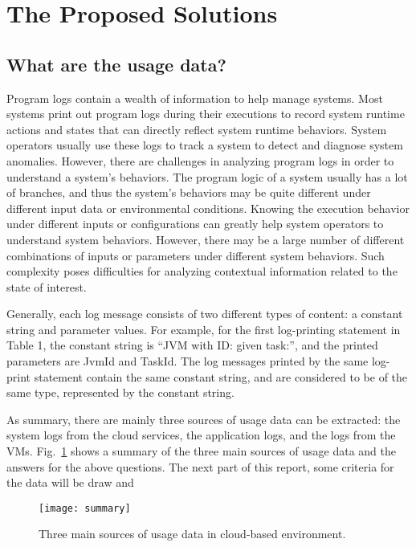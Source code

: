 \section{The Proposed Solutions}
\subsection{What are the usage data?}

 Program logs contain a wealth of information to help manage systems. Most systems print out program logs during their executions to record system runtime actions and states that can directly reflect system runtime behaviors. System operators usually use these logs to track a system to detect and diagnose system anomalies. However, there are challenges in analyzing program logs in order to understand a system’s behaviors. The program logic of a system usually has a lot of branches, and thus the system’s behaviors may be quite different under different input data or environmental conditions. Knowing the execution behavior under different inputs or configurations can greatly help system operators to understand system behaviors. However, there may be a large number of different combinations of inputs or parameters under different system behaviors. Such complexity poses difficulties for analyzing contextual information related to the state of interest. 

Generally, each log message consists of two different types
of content: a constant string and parameter values. For example, for the first log-printing statement in Table 1, the constant string is “JVM with ID: given task:”, and the printed parameters are JvmId and TaskId. The log messages printed by the same log-print statement contain the same constant string, and are considered to be of the same type, represented by the constant string. 

As summary, there are mainly three sources of usage data can be extracted: the system logs from the cloud services, the application logs, and the logs from the VMs. Fig.~\ref{fig:schema} shows a summary of the three main sources of usage data and the answers for the above questions. The next part of this report, some criteria for the data will be draw and 


\begin{figure}[t!]
	\centering
	\texttt{[image: summary]}
	\caption{Three main sources of usage data in cloud-based environment.}
	\label{fig:schema}
\end{figure}



